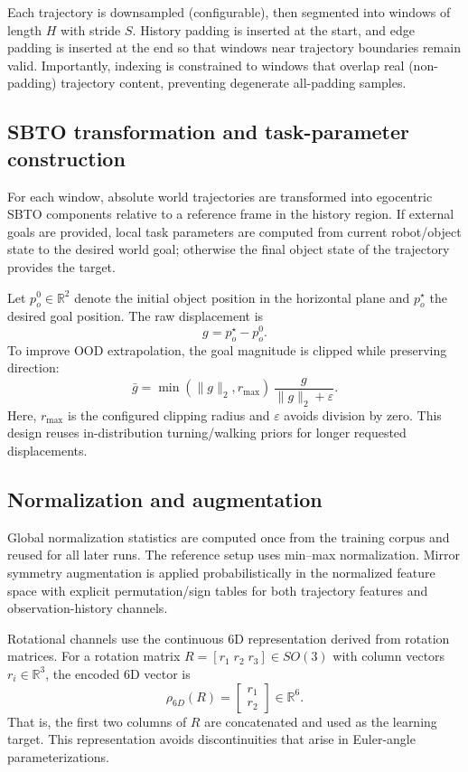 Each trajectory is downsampled (configurable), then segmented into windows of length $H$ with stride $S$. History padding is inserted at the start, and edge padding is inserted at the end so that windows near trajectory boundaries remain valid. Importantly, indexing is constrained to windows that overlap real (non-padding) trajectory content, preventing degenerate all-padding samples.

\subsection{SBTO transformation and task-parameter construction}

For each window, absolute world trajectories are transformed into egocentric SBTO components relative to a reference frame in the history region. If external goals are provided, local task parameters are computed from current robot/object state to the desired world goal; otherwise the final object state of the trajectory provides the target.

Let $p_o^0 \in \mathbb{R}^2$ denote the initial object position in the horizontal plane and $p_o^{\star}$ the desired goal position. The raw displacement is
\begin{equation}
g = p_o^{\star} - p_o^0.
\end{equation}
To improve OOD extrapolation, the goal magnitude is clipped while preserving direction:
\begin{equation}
\bar g = \min(\lVert g \rVert_2, r_{\max})\, \frac{g}{\lVert g \rVert_2 + \varepsilon}.
\label{eq:goal_clip}
\end{equation}
Here, $r_{\max}$ is the configured clipping radius and $\varepsilon$ avoids division by zero. This design reuses in-distribution turning/walking priors for longer requested displacements.

\subsection{Normalization and augmentation}

Global normalization statistics are computed once from the training corpus and reused for all later runs. The reference setup uses min--max normalization. Mirror symmetry augmentation is applied probabilistically in the normalized feature space with explicit permutation/sign tables for both trajectory features and observation-history channels.

Rotational channels use the continuous 6D representation derived from rotation matrices. For a rotation matrix $R=[r_1\;r_2\;r_3]\in SO(3)$ with column vectors $r_i\in\mathbb{R}^3$, the encoded 6D vector is
\begin{equation}
\rho_{6D}(R)=\begin{bmatrix}r_1 \\ r_2\end{bmatrix}\in\mathbb{R}^{6}.
\label{eq:rot6d_exp}
\end{equation}
That is, the first two columns of $R$ are concatenated and used as the learning target. This representation avoids discontinuities that arise in Euler-angle parameterizations.

